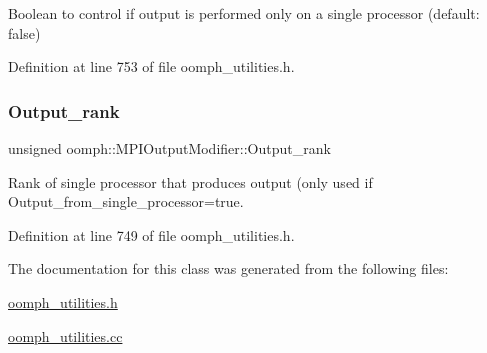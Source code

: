 Boolean to control if output is performed only on a single processor (default\+: false) 

Definition at line 753 of file oomph\+\_\+utilities.\+h.

\mbox{\label{classoomph_1_1MPIOutputModifier_ad255e5084d5a8df94597711a096d3863}} 
\subsubsection{\texorpdfstring{Output\+\_\+rank}{Output\_rank}}
{\footnotesize\ttfamily unsigned oomph\+::\+M\+P\+I\+Output\+Modifier\+::\+Output\+\_\+rank\hspace{0.3cm}{\ttfamily [private]}}



Rank of single processor that produces output (only used if Output\+\_\+from\+\_\+single\+\_\+processor=true. 



Definition at line 749 of file oomph\+\_\+utilities.\+h.



The documentation for this class was generated from the following files\+:\begin{DoxyCompactItemize}
\item 
\hyperlink{oomph__utilities_8h}{oomph\+\_\+utilities.\+h}\item 
\hyperlink{oomph__utilities_8cc}{oomph\+\_\+utilities.\+cc}\end{DoxyCompactItemize}
